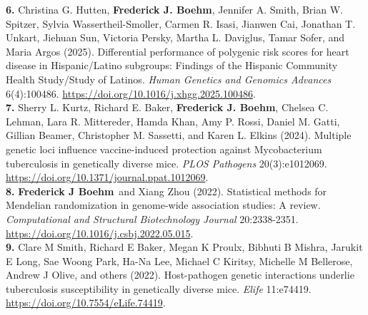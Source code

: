 \documentclass[
  10pt,
]
{article}
\begin{document}
\textbf{6.} \normalsize \normalsize Christina G. Hutten\normalsize ,
\textbf{\normalsize Frederick J. Boehm}\normalsize ,
\normalsize Jennifer A. Smith\normalsize , \normalsize Brian W.
Spitzer\normalsize , \normalsize Sylvia Wassertheil-Smoller\normalsize ,
\normalsize Carmen R. Isasi\normalsize , \normalsize Jianwen
Cai\normalsize , \normalsize Jonathan T. Unkart\normalsize ,
\normalsize Jiehuan Sun\normalsize , \normalsize Victoria
Persky\normalsize , \normalsize Martha L. Daviglus\normalsize ,
\normalsize Tamar Sofer\normalsize , and \normalsize Maria Argos (2025).
Differential performance of polygenic risk scores for heart disease in
Hispanic/Latino subgroups: Findings of the Hispanic Community Health
Study/Study of Latinos. \emph{Human Genetics and Genomics Advances}
6(4):100486. \url{https://doi.org/10.1016/j.xhgg.2025.100486}.\\
\textbf{7.} \normalsize \normalsize Sherry L. Kurtz\normalsize ,
\normalsize Richard E. Baker\normalsize ,
\textbf{\normalsize Frederick J. Boehm}\normalsize , \normalsize Chelsea
C. Lehman\normalsize , \normalsize Lara R. Mittereder\normalsize ,
\normalsize Hamda Khan\normalsize , \normalsize Amy P.
Rossi\normalsize , \normalsize Daniel M. Gatti\normalsize ,
\normalsize Gillian Beamer\normalsize , \normalsize Christopher M.
Sassetti\normalsize , and \normalsize Karen L. Elkins (2024). Multiple
genetic loci influence vaccine-induced protection against Mycobacterium
tuberculosis in genetically diverse mice. \emph{PLOS Pathogens}
20(3):e1012069. \url{https://doi.org/10.1371/journal.ppat.1012069}.\\
\textbf{8.}
\normalsize \textbf{\normalsize Frederick J Boehm}\normalsize ~and
\normalsize Xiang Zhou (2022). Statistical methods for Mendelian
randomization in genome-wide association studies: A review.
\emph{Computational and Structural Biotechnology Journal} 20:2338-2351.
\url{https://doi.org/10.1016/j.csbj.2022.05.015}.\\
\textbf{9.} \normalsize \normalsize Clare M Smith\normalsize ,
\normalsize Richard E Baker\normalsize , \normalsize Megan K
Proulx\normalsize , \normalsize Bibhuti B Mishra\normalsize ,
\normalsize Jarukit E Long\normalsize , \normalsize Sae Woong
Park\normalsize , \normalsize Ha-Na Lee\normalsize , \normalsize Michael
C Kiritsy\normalsize , \normalsize Michelle M Bellerose\normalsize ,
\normalsize Andrew J Olive\normalsize , and others (2022). Host-pathogen
genetic interactions underlie tuberculosis susceptibility in genetically
diverse mice. \emph{Elife} 11:e74419.
\url{https://doi.org/10.7554/eLife.74419}.\\
\end{document}
